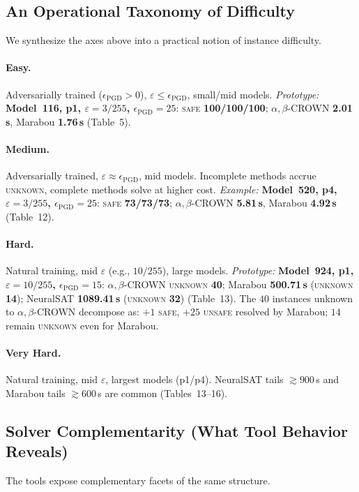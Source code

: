 \subsection{An Operational Taxonomy of Difficulty}
We synthesize the axes above into a practical notion of instance difficulty.

\paragraph{Easy.}
Adversarially trained ($\epsilon_{\mathrm{PGD}}>0$), $\varepsilon \le \epsilon_{\mathrm{PGD}}$, small/mid models.
\emph{Prototype:} \textbf{Model~116, p1, $\varepsilon{=}3/255$, $\epsilon_{\mathrm{PGD}}{=}25$}: \textsc{safe} \textbf{100/100/100}; $\alpha,\beta$-CROWN \textbf{2.01\,s}, Marabou \textbf{1.76\,s} (Table~5).

\paragraph{Medium.}
Adversarially trained, $\varepsilon \approx \epsilon_{\mathrm{PGD}}$, mid models. Incomplete methods accrue \textsc{unknown}, complete methods solve at higher cost.
\emph{Example:} \textbf{Model~520, p4, $\varepsilon{=}3/255$, $\epsilon_{\mathrm{PGD}}{=}25$}: \textsc{safe} \textbf{73/73/73}; $\alpha,\beta$-CROWN \textbf{5.81\,s}, Marabou \textbf{4.92\,s} (Table~12).

\paragraph{Hard.}
Natural training, mid $\varepsilon$ (e.g., $10/255$), large models.
\emph{Prototype:} \textbf{Model~924, p1, $\varepsilon{=}10/255$, $\epsilon_{\mathrm{PGD}}{=}15$}: $\alpha,\beta$-CROWN \textsc{unknown} \textbf{40}; Marabou \textbf{500.71\,s} (\textsc{unknown} \textbf{14}); NeuralSAT \textbf{1089.41\,s} (\textsc{unknown} \textbf{32}) (Table~13).
The $40$ instances unknown to $\alpha,\beta$-CROWN decompose as: $+1$ \textsc{safe}, $+25$ \textsc{unsafe} resolved by Marabou; $14$ remain \textsc{unknown} even for Marabou.

\paragraph{Very Hard.}
Natural training, mid $\varepsilon$, largest models (p1/p4). NeuralSAT tails $\gtrsim\!900$\,s and Marabou tails $\gtrsim\!600$\,s are common (Tables~13--16).

\subsection{Solver Complementarity (What Tool Behavior Reveals)}
The tools expose complementary facets of the same structure.

